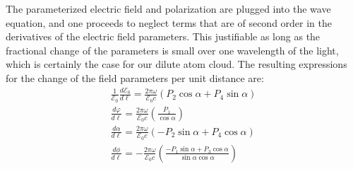 \documentclass[11pt,letter]{article}
\newcommand{\efieldo}{\ensuremath{\mathcal{E}_{0}}}
\begin{document}
The parameterized electric field and polarization are plugged into the wave
equation,  and one proceeds to neglect terms that are of second order in the
derivatives of the electric field parameters.  This justifiable as long as the
fractional change of the parameters is small over one wavelength of the light,
which is certainly the case for our dilute atom cloud.  The resulting
expressions for the change of the field parameters per unit distance are:
\begin{align}
 \frac{1}{\efieldo} \frac{d \efieldo }{ d \ell} =  
     \frac{2\pi \omega}{\efieldo c} ( P_{2} \cos\alpha + P_{4} \sin\alpha ) \\ 
 \frac{ d \varphi }{d \ell} = 
     \frac{2\pi\omega}{\efieldo c} \left( \frac{ P_{1} }{\cos\alpha} \right) \\
 \frac{ d \alpha}{ d \ell} = 
     \frac{2\pi\omega}{\efieldo c} ( -P_{2} \sin\alpha + P_{4} \cos\alpha ) \\
 \frac{ d \phi}{ d \ell} = 
     - \frac{2\pi\omega}{\efieldo c }
     \left(  \frac{ -P_{1}\sin\alpha + P_{3}\cos\alpha }{ \sin\alpha\cos\alpha } \right)
\end{align}
\end{document}
